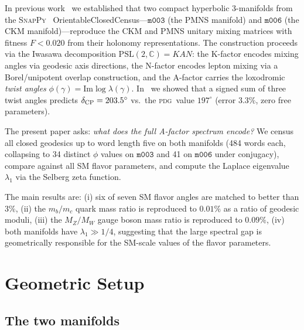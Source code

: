 \documentclass[11pt,a4paper]{article}
\newcommand{\PSL}{\mathrm{PSL}(2,\mathbb{C})}
\newcommand{\mfld}[1]{\texttt{#1}}
\newcommand{\degr}{^{\circ}}
\newcommand{\PDG}{\textsc{pdg}}
\begin{document}
In previous work~\cite{GentryCKM,GentryPMNS,GentryCP} we established that
two compact hyperbolic 3-manifolds from the \textsc{SnapPy}~\cite{SnapPy}
OrientableClosedCensus---$\mfld{m003}$ (the PMNS manifold) and $\mfld{m006}$
(the CKM manifold)---reproduce the CKM and PMNS unitary mixing matrices with
fitness $F < 0.020$ from their holonomy representations.
The construction proceeds via the Iwasawa decomposition
$\PSL = KAN$: the K-factor encodes mixing angles via geodesic axis directions,
the N-factor encodes lepton mixing via a Borel/unipotent overlap construction,
and the A-factor carries the loxodromic \emph{twist angles}
$\phi(\gamma) = \mathrm{Im}\log\lambda(\gamma)$.
In~\cite{GentryCP} we showed that a signed sum of three twist angles predicts
$\delta_{\rm CP} = 203.5\degr$ vs.\ the \PDG\ value $197\degr$ (error $3.3\%$,
zero free parameters).

The present paper asks: \emph{what does the full A-factor spectrum encode?}
We census all closed geodesics up to word length five on both manifolds
(484 words each, collapsing to 34 distinct $\phi$ values on $\mfld{m003}$
and 41 on $\mfld{m006}$ under conjugacy), compare against all SM flavor
parameters, and compute the Laplace eigenvalue $\lambda_1$ via the Selberg
zeta function.

The main results are:
(i) six of seven SM flavor angles are matched to better than $3\%$,
(ii) the $m_b/m_c$ quark mass ratio is reproduced to $0.01\%$ as a ratio of
geodesic moduli,
(iii) the $M_Z/M_W$ gauge boson mass ratio is reproduced to $0.09\%$,
(iv) both manifolds have $\lambda_1 \gg 1/4$, suggesting that the large spectral
gap is geometrically responsible for the SM-scale values of the flavor parameters.

\section{Geometric Setup}
\label{sec:setup}

\subsection{The two manifolds}
\end{document}
